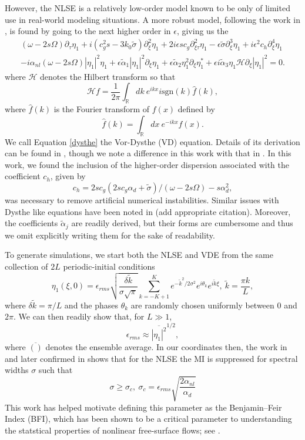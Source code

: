 \documentclass[a4paper,11pt]{article}
\newcommand{\pd}{\partial}
\begin{document}
However, the NLSE is a relatively low-order model known to be only of limited use in real-world modeling situations.  A more robust model, following the work in \cite{dysthe1}, is found by going to the next higher order in $\epsilon$, giving us the 
\begin{multline}
(\omega-2s\Omega)\pd_{\tau}\eta_{1} + i(c_{g}^{2}s-3k_{0}\tilde{\sigma})\pd_{\xi}^{2}\eta_{1} + 2i\epsilon s c_{g}\pd^{2}_{\xi\tau}\eta_{1} - \epsilon\tilde{\sigma} \pd^{3}_{\xi}\eta_{1} + i\epsilon^{2}c_{h}\pd_{\xi}^{4}\eta_{1} \\
- i \alpha_{nl}(\omega-2s\Omega)\left|\eta_{1}\right|^{2}\eta_{1}
+ \epsilon \tilde{\alpha}_{1}\left|\eta_{1}\right|^{2}\pd_{\xi}\eta_{1}
+ \epsilon\tilde{\alpha}_{2}\eta_{1}^{2}\pd_{\xi}\eta^{\ast}_{1} +
\epsilon i\tilde{\alpha}_{3}\eta_{1}\mathcal{H}\pd_{\xi}\left|\eta_{1}\right|^{2}= 0.
\label{dysthe}
\end{multline}
where $\mathcal{H}$ denotes the Hilbert transform so that 
\[
\mathcal{H}f = \frac{1}{2\pi}\int_{\mathbb{R}}dk~ e^{ikx}  i\mbox{sgn}(k) \hat{f}(k),
\]
where $\hat{f}(k)$ is the Fourier transform of $f(x)$ defined by
\[
\hat{f}(k) = \int_{\mathbb{R}}dx~ e^{-ikx}f(x).
\]
We call Equation \eqref{dysthe} the Vor-Dysthe (VD) equation.  Details of its derivation can be found in \cite{curtis8}, though we note a difference in this work with that in \cite{curtis8}.  In this work, we found the inclusion of the higher-order dispersion associated with the coefficient $c_{h}$, given by
\[
c_{h} = 2sc_{g}(2sc_{g}\alpha_{d}+\tilde{\sigma})/(\omega-2s\Omega) - s\alpha_{d}^{2},
\]
was necessary to remove artificial numerical instabilities.  Similar issues with Dysthe like equations have been noted in (add appropriate citation).  Moreover, the coefficients $\tilde{\alpha}_{j}$ are readily derived, but their forms are cumbersome and thus we omit explicitly writing them for the sake of readability.  

To generate simulations, we start both the NLSE and VDE from the same collection of $2L$ periodic-initial conditions
\[
\eta_{1}(\xi,0) = \epsilon_{rms}\sqrt{\frac{\delta \tilde{k}}{\sigma\sqrt{\pi}}} \sum_{k=-K+1}^{K}e^{-\tilde{k}^{2}/2\sigma^{2}}e^{i\theta_{k}}e^{i\tilde{k}\xi}, ~ \tilde{k} = \frac{\pi k}{L},
\]
where $\delta \tilde{k}=\pi/L$ and the phases $\theta_{k}$ are randomly chosen uniformly between $0$ and $2\pi$.  We can then readily show that, for $L\gg 1$, 
\[
\epsilon_{rms} \approx \overline{\left|\eta_{1}\right|^{2}}^{1/2},
\]
where $\overline{()}$ denotes the ensemble average.  In our coordinates then, the work in \cite{alber} and later confirmed in \cite{dysthe2} shows that for the NLSE the MI is suppressed for spectral widths $\sigma$ such that 
\[
\sigma \geq \sigma_{c}, ~ \sigma_{c} = \epsilon_{rms}\sqrt{\frac{2\alpha_{nl}}{\alpha_{d}}}
\]
This work has helped motivate defining this parameter as the Benjamin--Feir Index (BFI), which has been shown to be a critical parameter to understanding the statstical properties of nonlinear free-surface flows; see \cite{onorato, thomas2012nonlinear}.
\end{document}
